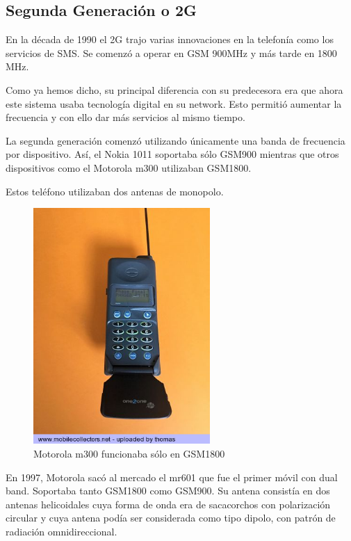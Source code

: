 \documentclass[a4paper,11pt,titlepage]{article}
\begin{document}
\subsection{Segunda Generación o 2G}
En la década de 1990 el 2G trajo varias innovaciones en la telefonía como los servicios de SMS. Se comenzó a operar en GSM 900MHz y más tarde en 1800 MHz.\par
Como ya hemos dicho, su principal diferencia con su predecesora era que ahora este sistema usaba tecnología digital en su network. Esto permitió aumentar la frecuencia y con ello dar más servicios al mismo tiempo.\par
La segunda generación comenzó utilizando únicamente una banda de frecuencia por dispositivo. Así, el Nokia 1011 soportaba sólo GSM900 mientras que otros dispositivos como el Motorola m300 utilizaban GSM1800.\par
Estos teléfono utilizaban dos antenas de monopolo.
\begin{figure}[h]
\centering
\includegraphics[width=0.6\textwidth]{motorolam300}
\caption{Motorola m300 funcionaba sólo en GSM1800}
\label{motorolam300}
\end{figure}
\par
En 1997, Motorola sacó al mercado el mr601 que fue el primer móvil con dual band. Soportaba tanto GSM1800 como GSM900. Su antena consistía en dos antenas helicoidales cuya forma de onda era de sacacorchos con polarización circular y cuya antena podía ser considerada como tipo dipolo, con patrón de radiación omnidireccional.
\end{document}
